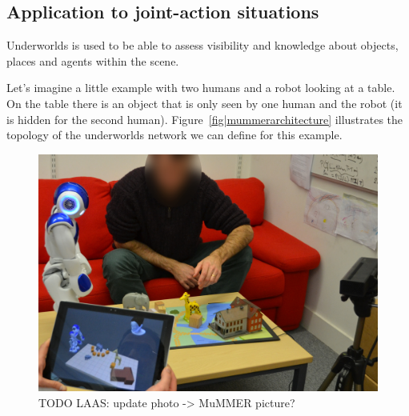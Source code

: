 \documentclass[letterpaper, 10pt, conference]{ieeeconf}
\newcommand{\uwds}{{\sc underworlds}\xspace}
\begin{document}
\subsection{Application to joint-action situations}

Underworlds is used 
to be able to assess visibility and knowledge about objects, places and agents within the scene.

Let's imagine a little example with two humans and a robot looking at a table. On the table there is an object that is only seen by one human and the robot (it is hidden for the second human). Figure~\ref{fig|mummerarchitecture} illustrates the topology of the \uwds network we can define for this example. 

\begin{figure}
    \centering
    \includegraphics[width=\linewidth]{l2tor-photo2-blind}
    \caption{TODO LAAS: update photo -> MuMMER picture?}
    \label{fig|mummer-example}
\end{figure}


\end{document}
